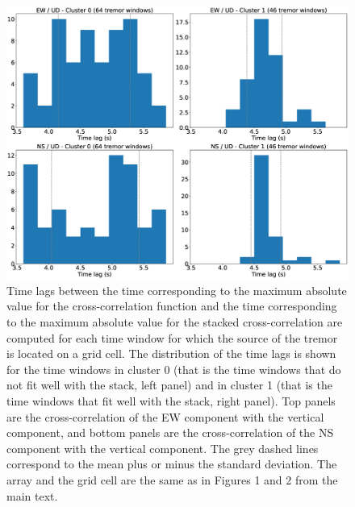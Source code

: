 \documentclass[draft]{agujournal2019}
\begin{document}
\begin{figure}
\noindent\includegraphics[width=\textwidth, trim={0cm 0cm 0cm 0cm},clip]{figures/BS_-05_-05_PWS_PWS_cluster_timelags.eps}
\caption{Time lags between the time corresponding to the maximum absolute value for the cross-correlation function and the time corresponding to the maximum absolute value for the stacked cross-correlation are computed for each time window for which the source of the tremor is located on a grid cell. The distribution of the time lags is shown for the time windows in cluster 0 (that is the time windows that do not fit well with the stack, left panel) and in cluster 1 (that is the time windows that fit well with the stack, right panel). Top panels are the cross-correlation of the EW component with the vertical component, and bottom panels are the cross-correlation of the NS component with the vertical component. The grey dashed lines correspond to the mean plus or minus the standard deviation. The array and the grid cell are the same as in Figures 1 and 2 from the main text.}
\label{pngfiguresample}
\end{figure}
\end{document}
